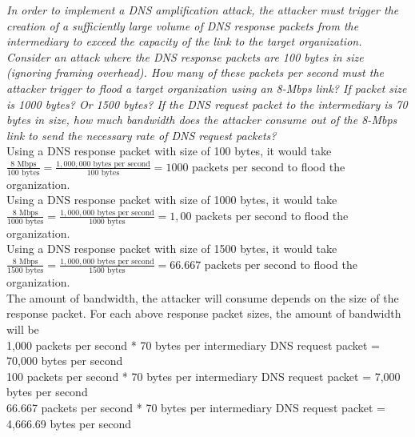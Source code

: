 \documentclass{article}
\begin{document}
\textit{In order to implement a DNS amplification attack, the attacker must trigger the creation of a sufficiently large volume of DNS response packets from the intermediary to exceed the capacity of the link to the target organization. Consider an attack where the DNS response packets are 100 bytes in size (ignoring framing overhead). How many of these packets per second must the attacker trigger to flood a target organization using an 8-Mbps link? If packet size is 1000 bytes? Or 1500 bytes? If the DNS request packet to the intermediary is 70 bytes in size, how much bandwidth does the attacker consume out of the 8-Mbps link to send the necessary rate of DNS request packets?}\\
 

Using a DNS response packet with size of 100 bytes, it would take 
$\frac{8 \text{ Mbps}}{100 \text{ bytes}} = \frac{1,000,000 \text{ bytes per second}}{100 \text{ bytes}} = 1000 \text{ packets per second}$
to flood the organization. \\ 

Using a DNS response packet with size of 1000 bytes, it would take 
$\frac{8 \text{ Mbps}}{1000 \text{ bytes}} = \frac{1,000,000 \text{ bytes per second}}{1000 \text{ bytes}} = 1,00 \text{ packets per second}$ 
to flood the organization. \\

Using a DNS response packet with size of 1500 bytes, it would take 
$\frac{8 \text{ Mbps}}{1500 \text{ bytes}} = \frac{1,000,000 \text{ bytes per second}}{1500 \text{ bytes}} = 66.667 \text{ packets per second}$ 
to flood the organization. \\
 
The amount of bandwidth, the attacker will consume depends on the size of the response packet. For each above response packet sizes, the amount of bandwidth will be \\

1,000 packets per second * 70 bytes per intermediary DNS request packet = 70,000 bytes per second\\

100 packets per second * 70 bytes per intermediary DNS request packet = 7,000 bytes per second\\

66.667 packets per second * 70 bytes per intermediary DNS request packet = 4,666.69 bytes per second
\end{document}
